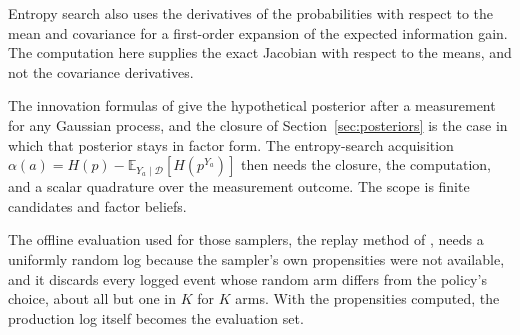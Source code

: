 \documentclass[11pt]{article}
\begin{document}
Entropy search also uses the derivatives of the probabilities with respect
to the mean and covariance for a first-order expansion of the
expected information gain. The computation here supplies the exact
Jacobian with respect to the means, and not the covariance
derivatives.

The innovation formulas of \citet{hennig2012} give the hypothetical
posterior after a measurement for any Gaussian process, and the
closure of Section~\ref{sec:posteriors} is the case in which that
posterior stays in factor form. The entropy-search acquisition
$\alpha(a) = H(p) - \mathbb{E}_{Y_a \mid \mathcal{D}}[H(p^{Y_a})]$
then needs the closure, the computation, and a scalar quadrature over
the measurement outcome. The scope is finite candidates and factor
beliefs.

The offline evaluation used for
those samplers, the replay method of \citet{li2011}, needs a
uniformly random log because the sampler's own propensities were not
available, and it discards every logged event whose random arm
differs from the policy's choice, about all but one in $K$ for $K$
arms. With the propensities computed, the production log itself becomes
the evaluation set.
\end{document}
